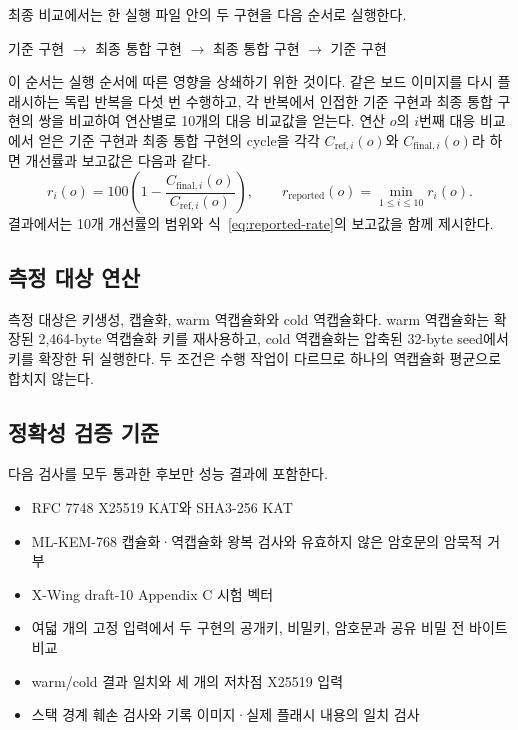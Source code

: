 \documentclass[runningheads,orivec]{llncs}
\newcommand{\xwing}{X-Wing}
\begin{document}
최종 비교에서는 한 실행 파일 안의 두 구현을 다음 순서로 실행한다.
\begin{center}
기준 구현 $\rightarrow$ 최종 통합 구현 $\rightarrow$ 최종 통합 구현
$\rightarrow$ 기준 구현
\end{center}
이 순서는 실행 순서에 따른 영향을 상쇄하기 위한 것이다. 같은 보드 이미지를 다시
플래시하는 독립 반복을 다섯 번 수행하고, 각 반복에서 인접한 기준 구현과 최종 통합
구현의 쌍을 비교하여 연산별로 10개의 대응 비교값을 얻는다. 연산 $o$의 $i$번째
대응 비교에서 얻은 기준 구현과 최종 통합 구현의 cycle을 각각
$C_{\mathrm{ref},i}(o)$와 $C_{\mathrm{final},i}(o)$라 하면 개선률과 보고값은
다음과 같다.
\begin{equation}
r_i(o)=100\left(1-\frac{C_{\mathrm{final},i}(o)}{C_{\mathrm{ref},i}(o)}\right),
\qquad
r_{\mathrm{reported}}(o)=\min_{1\le i\le10}r_i(o).
\label{eq:reported-rate}
\end{equation}
결과에서는 10개 개선률의 범위와 식~\eqref{eq:reported-rate}의 보고값을 함께 제시한다.

\subsection{측정 대상 연산}

측정 대상은 키생성, 캡슐화, warm 역캡슐화와 cold 역캡슐화다. warm 역캡슐화는
확장된 2,464-byte 역캡슐화 키를 재사용하고, cold 역캡슐화는 압축된 32-byte
seed에서 키를 확장한 뒤 실행한다. 두 조건은 수행 작업이 다르므로 하나의 역캡슐화
평균으로 합치지 않는다.

\subsection{정확성 검증 기준}

다음 검사를 모두 통과한 후보만 성능 결과에 포함한다.
\begin{itemize}[leftmargin=*,itemsep=1pt]
\item RFC 7748 X25519 KAT와 SHA3-256 KAT
\item ML-KEM-768 캡슐화·역캡슐화 왕복 검사와 유효하지 않은 암호문의 암묵적 거부
\item \xwing{} draft-10 Appendix C 시험 벡터
\item 여덟 개의 고정 입력에서 두 구현의 공개키, 비밀키, 암호문과 공유 비밀 전 바이트 비교
\item warm/cold 결과 일치와 세 개의 저차점 X25519 입력
\item 스택 경계 훼손 검사와 기록 이미지·실제 플래시 내용의 일치 검사
\end{itemize}
\end{document}
